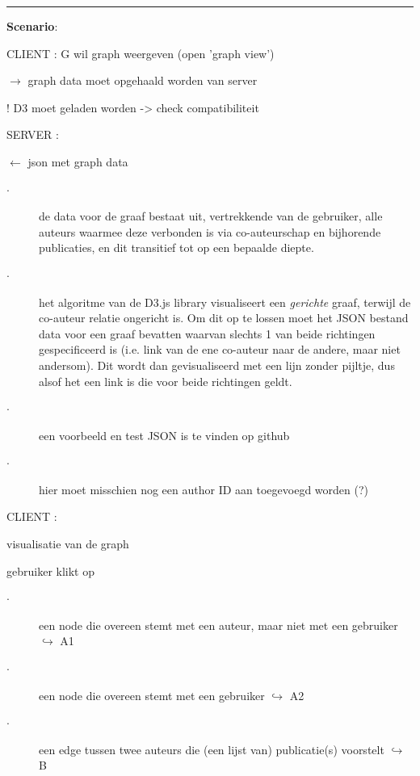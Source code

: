 \documentclass{article}
\begin{document}
\hrule
\vspace{2 mm}
\noindent \textbf{Scenario}:
\begin{description}
\item CLIENT : G wil graph weergeven (open 'graph view')
	\begin{description}
	\item $\rightarrow$ graph data moet opgehaald worden van server
	\item ! D3 moet geladen worden -> check compatibiliteit 
	\end{description}
	
\item SERVER : 
	\begin{description}
	\item $\leftarrow$ json met graph data 
		\begin{description}
		\item [$\cdot$] de data voor de graaf bestaat uit, vertrekkende van de gebruiker, alle auteurs waarmee deze verbonden is via co-auteurschap en bijhorende publicaties, en dit transitief tot op een bepaalde diepte. 
		\item [$\cdot$] het algoritme van de D3.js library visualiseert een \emph{gerichte} graaf, terwijl de co-auteur relatie ongericht is. Om dit op te lossen moet het JSON bestand data voor een graaf bevatten waarvan slechts 1 van beide richtingen gespecificeerd is (i.e. link van de ene co-auteur naar de andere, maar niet andersom). Dit wordt dan gevisualiseerd met een lijn zonder pijltje, dus alsof het een link is die voor beide richtingen geldt.  
		\item [$\cdot$] een voorbeeld en test JSON is te vinden op github 
		\item [$\cdot$] hier moet misschien nog een author ID aan toegevoegd worden (?)
		\end{description}
	\end{description}
	 
\item CLIENT : 
	\begin{description}
	\item visualisatie van de graph
	\item gebruiker klikt op
		\begin{description}
		\item  [$\cdot$] een node die overeen stemt met een auteur, maar niet met een gebruiker $\hookrightarrow$ A1
		\item  [$\cdot$] een node die overeen stemt met een gebruiker $\hookrightarrow$ A2
		\item  [$\cdot$]een edge tussen twee auteurs die (een lijst van) publicatie(s) voorstelt $\hookrightarrow$ B
		\end{description}
	\end{description}
	

\end{description}
\end{document}
